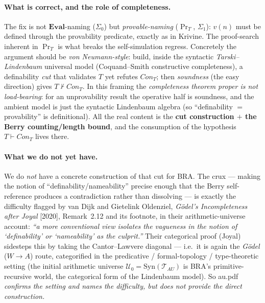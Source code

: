 \documentclass[11pt]{article}
\theoremstyle{plain}
\theoremstyle{definition}
\theoremstyle{remark}
\newcommand{\Con}{\mathit{Con}}
\newcommand{\Eval}{\mathbf{Eval}}
\begin{document}
\paragraph{What is correct, and the role of completeness.}  The fix is
not $\Eval$-naming ($\Sigma_0$) but \emph{provable-naming} ($\Pr_T$,
$\Sigma_1$): $v(n)$ must be defined through the provability predicate,
exactly as in Krivine.  The proof-search inherent in $\Pr_T$ is what
breaks the self-simulation regress.  Concretely the argument should be
\emph{von Neumann-style}: build, inside the syntactic
\emph{Tarski--Lindenbaum} universal model (Coquand--Smith constructive
completeness), a definability \emph{cut} that validates $T$ yet refutes
$\Con_T$; then \emph{soundness} (the easy direction) gives
$T \not\vdash \Con_T$.  In this framing the \emph{completeness theorem
proper is not load-bearing}: for an unprovability result the operative
half is soundness, and the ambient model is just the syntactic
Lindenbaum algebra (so ``definability $=$ provability'' is
definitional).  All the real content is the \textbf{cut construction
$+$ the Berry counting/length bound}, and the consumption of the
hypothesis $T \vdash \Con_T$ lives there.

\paragraph{What we do not yet have.}  We do \emph{not} have a concrete
construction of that cut for BRA.  The crux --- making the notion of
``definability/nameability'' precise enough that the Berry self-
reference produces a contradiction rather than dissolving --- is
exactly the difficulty flagged by van Dijk and Gietelink Oldenziel,
\emph{G\"odel's Incompleteness after Joyal} [2020], Remark~2.12 and its
footnote, in their arithmetic-universe account: \emph{``a more
conventional view isolates the vagueness in the notion of
`definability' or `nameability' as the culprit.''}  Their categorical proof (Joyal) sidesteps this by taking
the Cantor--Lawvere diagonal --- i.e.\ it is again the \emph{G\"odel}
($W\to A$) route, categorified in the predicative / formal-topology /
type-theoretic setting (the initial arithmetic universe $\mathcal U_0 =
\mathrm{Syn}(\mathcal T_{AU})$ is BRA's primitive-recursive world, the
categorical form of the Lindenbaum model).  So au.pdf \emph{confirms
the setting and names the difficulty, but does not provide the direct
construction.}
\end{document}
